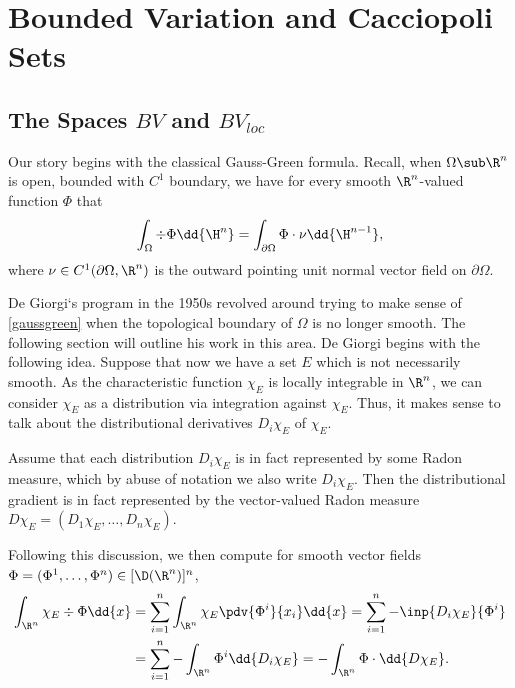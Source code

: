 \documentclass[../main.tex]{subfiles}
\begin{document}
\section{Bounded Variation and Cacciopoli Sets}

\subsection{The Spaces $ BV $ and $ BV_{loc} $}\label{sec:bv}


\begin{figure}[H]

\end{figure}

Our story begins with the classical Gauss-Green formula. Recall, when $ \Omega\sub \R^{n} $ is open, bounded with $ C^{1} $ boundary, we have for every smooth $ \R^{n} $-valued function $ \Phi $ that
\begin{equation}\label{gaussgreen}
    \int_{\Omega} \div{\Phi} \dd{\H^{n}} = \int_{\partial \Omega} \Phi\cdot \nu \dd{\H^{n-1}},
\end{equation}
where $ \nu\in C^{1}(\partial \Omega, \R^{n})  $ is the outward pointing unit normal vector field on $ \partial \Omega $.



De Giorgi`s program in the 1950s revolved around trying to make sense of \eqref{gaussgreen} when the topological boundary of $ \Omega $ is no longer smooth. The following section will outline his work in this area. De Giorgi begins with the following idea. Suppose that now we have a set $ E $ which is not necessarily smooth. As the characteristic function $ \chi_{E} $ is locally integrable in $ \R^{n} $, we can consider $ \chi_{E} $ as a distribution via integration against $ \chi_{E} $. Thus, it makes sense to talk about the distributional derivatives $ D_{i}\chi_{E} $ of $ \chi_{E} $. 

Assume that each distribution $ D_{i} \chi_{E} $ is in fact represented by some Radon measure, which by abuse of notation we also write $ D_{i} \chi_{E} $. Then the distributional gradient is in fact represented by the vector-valued Radon measure $ D\chi_{E} = (D_{1} \chi_{E}, \ldots, D_{n}\chi_{E}) $.

Following this discussion, we then compute for smooth vector fields $ \Phi = ( \Phi^{1}, \ldots, \Phi^{n})\in [\D(\R^{n})]^{n} $,
\begin{align*}
    \int_{\R^{n}} \chi_{E}\div{\Phi} \dd{x} &= \sum_{i=1}^{n}\int_{\R^{n}} \chi_{E} \pdv{\Phi^{i}}{x_{i}} \dd{x} = \sum_{i=1}^{n} -\inp{D_{i} \chi_{E}}{\Phi^{i}} \\
    &= \sum_{i=1}^{n} -\int_{\R^{n}} \Phi^{i} \dd{D_{i} \chi_{E}}= - \int_{\R^{n}} \Phi\cdot \dd{D \chi_{E}}.
\end{align*}
\end{document}
